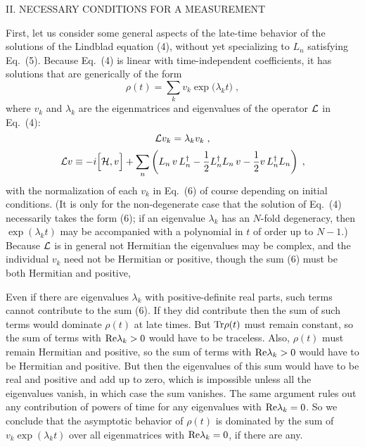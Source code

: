 \begin{center}
II. NECESSARY CONDITIONS FOR A MEASUREMENT
\end{center}

First, let us consider some general aspects of the late-time behavior of the solutions of the Lindblad equation (4), without yet specializing to $L_n$ satisfying Eq.~(5).  Because Eq.~(4) is linear with time-independent coefficients, it has solutions that are generically of the form
\begin{equation}
\rho(t)=\sum_k v_k \exp\Big(\lambda_k t\Big)\;,
\end{equation}
where $v_k$ and $\lambda_k$ are the eigenmatrices and eigenvalues of the operator ${\cal L}$ in Eq.~(4):
\begin{equation}
{\cal L}v_k=\lambda_k v_k\;,
\end{equation}
\begin{equation}
{\cal L}v\equiv -i\Big[{\cal H},v\Big]+\sum_n \left(L_n\,v\,L_n^\dagger-\frac{1}{2}L_n^\dagger L_n\, v
-\frac{1}{2}v\, L_n^\dagger L_n\right)\;,
\end{equation}
with the normalization of each $v_k$ in Eq.~(6) of course depending on initial conditions.
(It is only  for the non-degenerate case that the solution of Eq.~(4) necessarily takes the form (6); if an eigenvalue $\lambda_k$ has an $N$-fold degeneracy, then $\exp(\lambda_kt)$ may be accompanied with a polynomial in $t$ of order up to $N-1$.)  Because ${\cal L}$ is in general not Hermitian the eigenvalues may be complex, and  the individual $v_k$ need not be Hermitian or positive, though the sum (6) must be both Hermitian and positive, 

Even if there are  eigenvalues $\lambda_k$ with positive-definite real parts, such terms cannot contribute to the sum (6).  If they did contribute then the sum of such terms would dominate $\rho(t)$  at late times. But ${\rm Tr}\rho(t)$ must remain constant, so the sum of terms with ${\rm Re}\lambda_k>0$ would have to be traceless.  Also, $\rho(t)$ must remain Hermitian and positive, so the sum of terms with ${\rm Re}\lambda_k>0$ would have to be Hermitian and positive. But then the eigenvalues of this sum would have to be real and positive and add up to zero, which is impossible unless all the eigenvalues vanish, in which case the sum vanishes.  The  same argument rules out any contribution of powers of time for any eigenvalues with ${\rm Re}\lambda_k=0$.  So we conclude that the asymptotic behavior of $\rho(t)$ is dominated by the sum of $v_k\exp(\lambda_k t)$ over all eigenmatrices with ${\rm Re}\lambda_k=0$, if there are any.  

